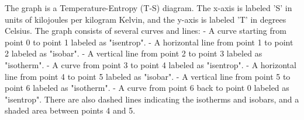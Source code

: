 The graph is a Temperature-Entropy (T-S) diagram. The x-axis is labeled 'S' in units of kilojoules per kilogram Kelvin, and the y-axis is labeled 'T' in degrees Celsius. The graph consists of several curves and lines:
- A curve starting from point 0 to point 1 labeled as "isentrop".
- A horizontal line from point 1 to point 2 labeled as "isobar".
- A vertical line from point 2 to point 3 labeled as "isotherm".
- A curve from point 3 to point 4 labeled as "isentrop".
- A horizontal line from point 4 to point 5 labeled as "isobar".
- A vertical line from point 5 to point 6 labeled as "isotherm".
- A curve from point 6 back to point 0 labeled as "isentrop".
There are also dashed lines indicating the isotherms and isobars, and a shaded area between points 4 and 5.